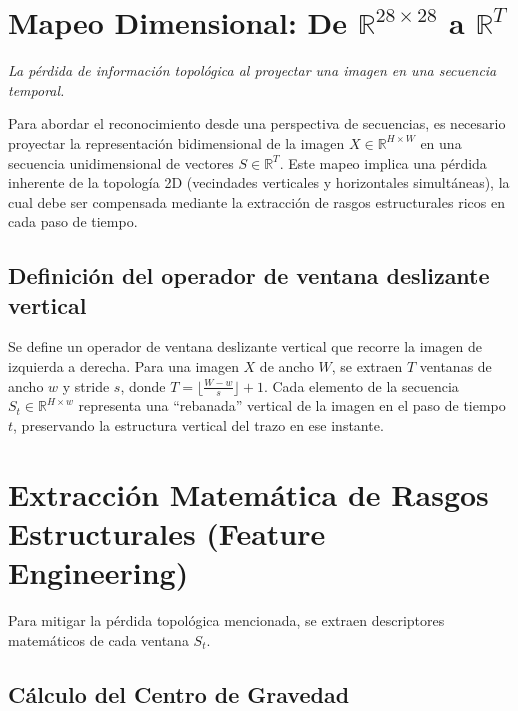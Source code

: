 \documentclass[
  spanish,
  us-letterpaper,
  DIV=11,
  numbers=noendperiod]{scrreprt}
\begin{document}
\section{\texorpdfstring{Mapeo Dimensional: De
\(\mathbb{R}^{28 \times 28}\) a
\(\mathbb{R}^T\)}{Mapeo Dimensional: De \textbackslash mathbb\{R\}\^{}\{28 \textbackslash times 28\} a \textbackslash mathbb\{R\}\^{}T}}\label{mapeo-dimensional-de-mathbbr28-times-28-a-mathbbrt}

\emph{La pérdida de información topológica al proyectar una imagen en
una secuencia temporal.}

Para abordar el reconocimiento desde una perspectiva de secuencias, es
necesario proyectar la representación bidimensional de la imagen
\(X \in \mathbb{R}^{H \times W}\) en una secuencia unidimensional de
vectores \(S \in \mathbb{R}^T\). Este mapeo implica una pérdida
inherente de la topología 2D (vecindades verticales y horizontales
simultáneas), la cual debe ser compensada mediante la extracción de
rasgos estructurales ricos en cada paso de tiempo.

\subsection{Definición del operador de ventana deslizante
vertical}\label{definiciuxf3n-del-operador-de-ventana-deslizante-vertical}

Se define un operador de ventana deslizante vertical que recorre la
imagen de izquierda a derecha. Para una imagen \(X\) de ancho \(W\), se
extraen \(T\) ventanas de ancho \(w\) y stride \(s\), donde
\(T = \lfloor \frac{W - w}{s} \rfloor + 1\). Cada elemento de la
secuencia \(S_t \in \mathbb{R}^{H \times w}\) representa una
``rebanada'' vertical de la imagen en el paso de tiempo \(t\),
preservando la estructura vertical del trazo en ese instante.

\section{Extracción Matemática de Rasgos Estructurales (Feature
Engineering)}\label{extracciuxf3n-matemuxe1tica-de-rasgos-estructurales-feature-engineering}

Para mitigar la pérdida topológica mencionada, se extraen descriptores
matemáticos de cada ventana \(S_t\).

\subsection{Cálculo del Centro de
Gravedad}\label{cuxe1lculo-del-centro-de-gravedad}
\end{document}
